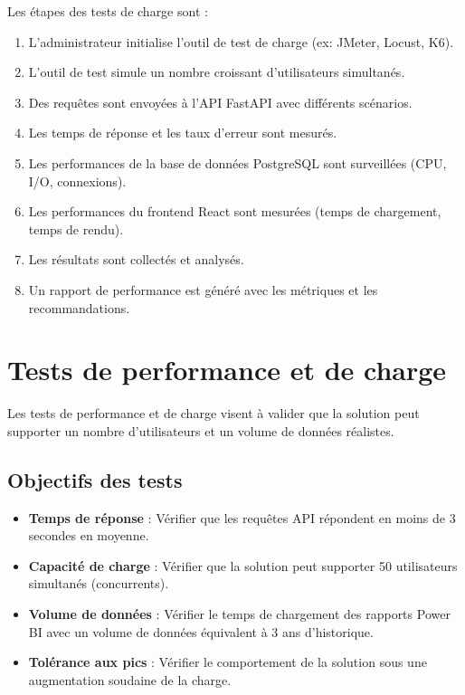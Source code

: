 Les étapes des tests de charge sont :

\begin{enumerate}
    \item L'administrateur initialise l'outil de test de charge (ex: JMeter, Locust, K6).
    \item L'outil de test simule un nombre croissant d'utilisateurs simultanés.
    \item Des requêtes sont envoyées à l'API FastAPI avec différents scénarios.
    \item Les temps de réponse et les taux d'erreur sont mesurés.
    \item Les performances de la base de données PostgreSQL sont surveillées (CPU, I/O, connexions).
    \item Les performances du frontend React sont mesurées (temps de chargement, temps de rendu).
    \item Les résultats sont collectés et analysés.
    \item Un rapport de performance est généré avec les métriques et les recommandations.
\end{enumerate}

\section{Tests de performance et de charge}
\label{sec:sprint8-performance}

Les tests de performance et de charge visent à valider que la solution peut supporter un nombre d'utilisateurs et un volume de données réalistes.

\subsection{Objectifs des tests}

\begin{itemize}
    \item \textbf{Temps de réponse} : Vérifier que les requêtes API répondent en moins de 3 secondes en moyenne.
    \item \textbf{Capacité de charge} : Vérifier que la solution peut supporter 50 utilisateurs simultanés (concurrents).
    \item \textbf{Volume de données} : Vérifier le temps de chargement des rapports Power BI avec un volume de données équivalent à 3 ans d'historique.
    \item \textbf{Tolérance aux pics} : Vérifier le comportement de la solution sous une augmentation soudaine de la charge.
\end{itemize}


